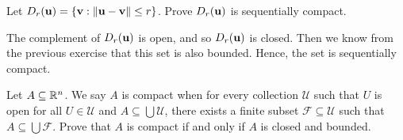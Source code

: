 \documentclass[letterpaper, twoside, 12pt]{book}
\begin{document}
\begin{exercise}[2]
  Let \(D_r(\mathbf u)=\{\mathbf v:\|\mathbf u-\mathbf v\|\leq r\}\).
  Prove \(D_r(\mathbf u)\) is sequentially compact.
\end{exercise}

\begin{solution}
    The complement of \(D_r(\mathbf u)\) is open, and so
    \(D_r(\mathbf u)\) is closed. Then we know from the previous
    exercise that this set is also bounded. Hence, the
    set is sequentially compact.
\end{solution}

\begin{exercise}
  Let \(A\subseteq\mathbb R^n\). We say \(A\) is compact when for every
  collection \(\mathcal U\) such that \(U\) is open
  for all \(U\in\mathcal U\) and \(A\subseteq\bigcup\mathcal U\), there exists
  a finite subset \(\mathcal F\subseteq\mathcal U\) such that
  \(A\subseteq\bigcup\mathcal F\). Prove that \(A\) is compact if and only if
  \(A\) is closed and bounded.
\end{exercise}
\end{document}
